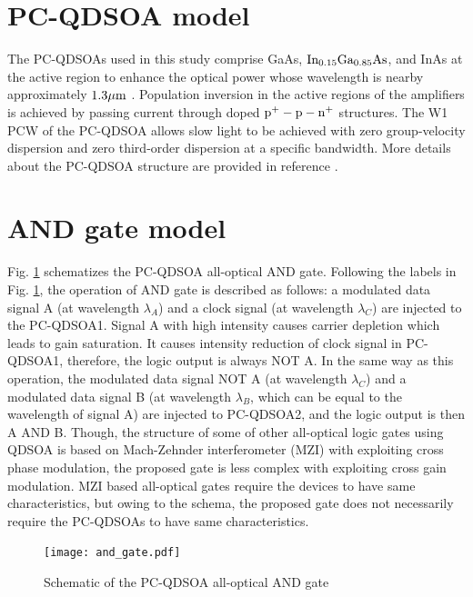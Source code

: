\documentclass[twocolumn]{el-author}
\begin{document}
\section{PC-QDSOA model}
The PC-QDSOAs used in this study comprise GaAs, ${\rm{In_{0.15}Ga_{0.85}As}}$, and InAs at the active region to enhance the optical power whose wavelength is nearby approximately ${\rm{1.3 \mu m}}$ {\cite{theory_of_qdsoa}}. Population inversion in the active regions of the amplifiers is achieved by passing current through doped ${\rm{p^{+}-p-n^{+}}}$ structures. The W1 PCW of the PC-QDSOA allows slow light to be achieved with zero group-velocity dispersion and zero third-order dispersion at a specific bandwidth. More details about the PC-QDSOA structure are provided in reference {\cite{pcqdsoa}}.

\section{AND gate model}
Fig. {\ref{fig:and_gate}} schematizes the PC-QDSOA all-optical AND gate. Following the labels in Fig. {\ref{fig:and_gate}}, the operation of AND gate is described as follows: a modulated data signal A (at wavelength $\lambda_{A}$) and a clock signal (at wavelength $\lambda_{C}$) are injected to the PC-QDSOA1. Signal A with high intensity causes carrier depletion which leads to gain saturation. It causes intensity reduction of clock signal in PC-QDSOA1, therefore, the logic output is always NOT A. In the same way as this operation, the modulated data signal NOT A (at wavelength $\lambda_{C}$) and a modulated data signal B (at wavelength $\lambda_{B}$, which can be equal to the wavelength of signal A) are injected to PC-QDSOA2, and the logic output is then A AND B. Though, the structure of some of other all-optical logic gates using QDSOA is based on Mach-Zehnder interferometer (MZI) {\cite{mzi_gate}} with exploiting cross phase modulation, the proposed gate is less complex with exploiting cross gain modulation. MZI based all-optical gates require the devices to have same characteristics, but owing to the schema, the proposed gate does not necessarily require the PC-QDSOAs to have same characteristics.

\begin{figure}[htbp]
\begin{center}
  \texttt{[image: and\_gate.pdf]}
  \caption{Schematic of the PC-QDSOA all-optical AND gate}
  \label{fig:and_gate}
\end{center}
\end{figure}
\end{document}
